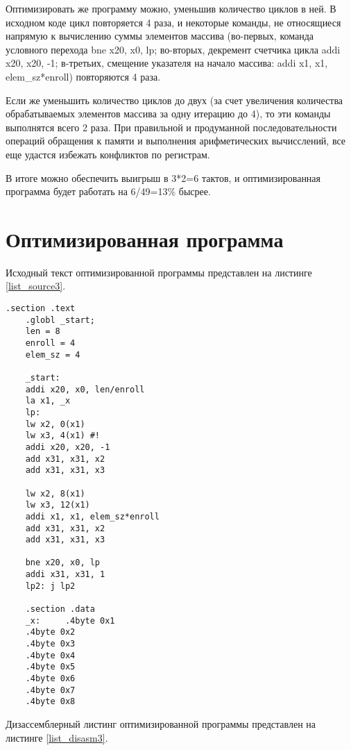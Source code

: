 Оптимизировать же программу можно, уменьшив количество циклов в ней. В исходном коде цикл повторяется 4 раза, и некоторые команды, не относящиеся напрямую к вычислению суммы элементов массива (во-первых, команда условного перехода bne x20, x0, lp; во-вторых, декремент счетчика цикла addi x20, x20, -1; в-третьих, смещение указателя на начало массива: addi x1, x1, elem\_sz*enroll) повторяются 4 раза. 

Если же уменьшить количество циклов до двух (за счет увеличения количества обрабатываемых элементов массива за одну итерацию до 4), то эти команды выполнятся всего 2 раза. При правильной и продуманной последовательности операций обращения к памяти и выполнения арифметических вычисслений, все еще удастся избежать конфликтов по регистрам. 

В итоге можно обеспечить выигрыш в 3*2=6 тактов, и оптимизированная программа будет работать на 6/49=13\% бысрее.


\section*{Оптимизированная программа}

Исходный текст оптимизированной программы  представлен на листинге \ref{list_source3}.

\begin{lstlisting}[caption=Исходный текст оптимизированной программы,
	label={list_source3}]
	        .section .text
	.globl _start;
	len = 8 
	enroll = 4 
	elem_sz = 4
	
	_start:
	addi x20, x0, len/enroll
	la x1, _x
	lp:
	lw x2, 0(x1)
	lw x3, 4(x1) #!
	addi x20, x20, -1
	add x31, x31, x2
	add x31, x31, x3
	
	lw x2, 8(x1)
	lw x3, 12(x1)
	addi x1, x1, elem_sz*enroll
	add x31, x31, x2
	add x31, x31, x3
	
	bne x20, x0, lp
	addi x31, x31, 1
	lp2: j lp2
	
	.section .data
	_x:     .4byte 0x1
	.4byte 0x2
	.4byte 0x3
	.4byte 0x4
	.4byte 0x5
	.4byte 0x6
	.4byte 0x7
	.4byte 0x8
\end{lstlisting}

\clearpage
Дизассемблерный листинг оптимизированной программы  представлен на листинге \ref{list_disasm3}.


